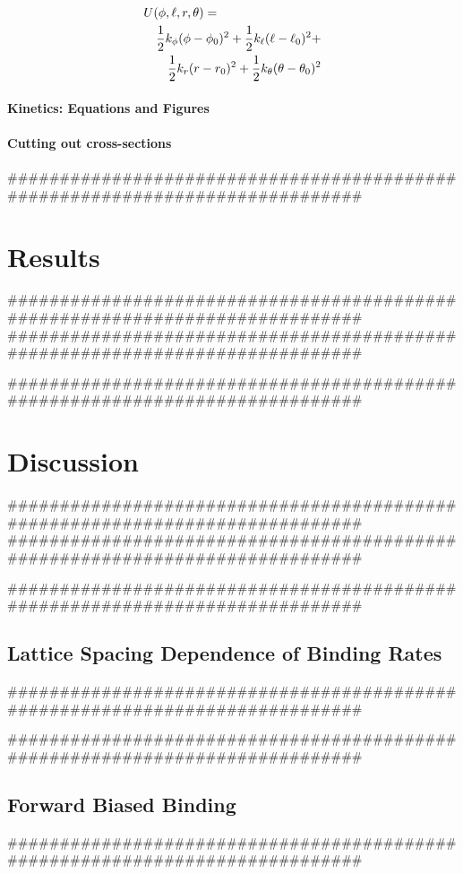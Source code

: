 \documentclass[11pt]{article}
\begin{document}
\begin{multicols}{2}
\begin{eqnarray}
	\lefteqn{U(\phi,\ell,r,\theta) = }  \nonumber \\
 	& & \frac{1}{2}k_\phi (\phi-\phi_0)^2 + \frac{1}{2}k_\ell (\ell-\ell_0)^2 + \nonumber \\
	& & \frac{1}{2}k_r (r-r_0)^2 + \frac{1}{2}k_\theta (\theta-\theta_0)^2
\end{eqnarray}

\paragraph*{Kinetics: Equations and Figures}
\paragraph*{Cutting out cross-sections}


#############################################################################
\section*{Results}
#############################################################################
#############################################################################



#############################################################################
\section*{Discussion}
#############################################################################
#############################################################################


#############################################################################
\subsection*{Lattice Spacing Dependence of Binding Rates}
#############################################################################


#############################################################################
\subsection*{Forward Biased Binding}
#############################################################################

%

\end{multicols}
\end{document}
